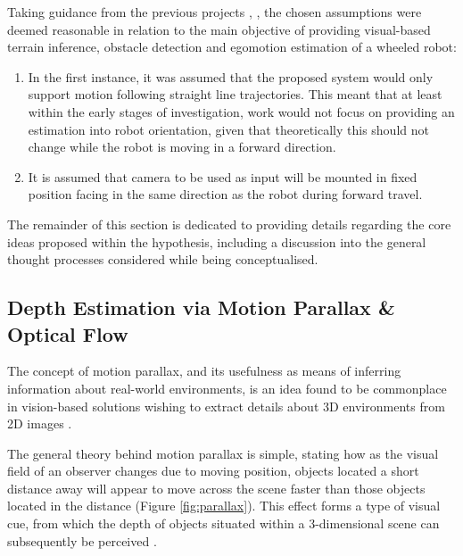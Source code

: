 Taking guidance from the previous projects \cite{campbell}, \cite{wyeth}, the chosen assumptions were deemed reasonable in relation to the main objective of providing visual-based terrain inference, obstacle detection and egomotion estimation of a wheeled robot:

 \begin{enumerate}
 	\item In the first instance, it was assumed that the proposed system would only support motion following straight line trajectories. This meant that at least within the early stages of investigation, work would not focus on providing an estimation into robot orientation, given that theoretically this should not change while the robot is moving in a forward direction.
 	\item It is assumed that camera to be used as input will be mounted in fixed position facing in the same direction as the robot during forward travel.
 	
 \end{enumerate}

The remainder of this section is dedicated to providing details regarding the core ideas proposed within the hypothesis, including a discussion into the general thought processes considered while being conceptualised.

\subsection{Depth Estimation via Motion Parallax \& Optical Flow}

The concept of motion parallax, and its usefulness as means of inferring information about real-world environments, is an idea found to be commonplace in vision-based solutions wishing to extract details about 3D environments from 2D images \cite{lu}.  

The general theory behind motion parallax is simple, stating how as the visual field of an observer changes due to moving position, objects located a short distance away will appear to move across the scene faster than those objects located in the distance (Figure \ref{fig:parallax}). This effect forms a type of visual cue, from which the depth of objects situated within a 3-dimensional scene can subsequently be perceived \cite{rogers}.

